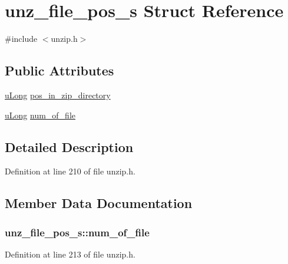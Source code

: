 \hypertarget{structunz__file__pos__s}{\section{unz\+\_\+file\+\_\+pos\+\_\+s Struct Reference}
\label{structunz__file__pos__s}
}


{\ttfamily \#include $<$unzip.\+h$>$}

\subsection*{Public Attributes}
\begin{DoxyCompactItemize}
\item 
\hyperlink{ioapi_8h_a50e9e9d5c30e481de822ad68fe537986}{u\+Long} \hyperlink{structunz__file__pos__s_a87d193346d3825363f899f574a2f3cb2}{pos\+\_\+in\+\_\+zip\+\_\+directory}
\item 
\hyperlink{ioapi_8h_a50e9e9d5c30e481de822ad68fe537986}{u\+Long} \hyperlink{structunz__file__pos__s_a771dc0b7dba811b6174382f87f6800fc}{num\+\_\+of\+\_\+file}
\end{DoxyCompactItemize}


\subsection{Detailed Description}


Definition at line 210 of file unzip.\+h.



\subsection{Member Data Documentation}
\hypertarget{structunz__file__pos__s_a771dc0b7dba811b6174382f87f6800fc}{
\subsubsection[{num\+\_\+of\+\_\+file}]{ unz\+\_\+file\+\_\+pos\+\_\+s\+::num\+\_\+of\+\_\+file}}\label{structunz__file__pos__s_a771dc0b7dba811b6174382f87f6800fc}


Definition at line 213 of file unzip.\+h.

